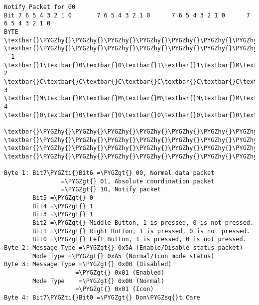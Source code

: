 \documentclass[a4paper,8pt,english]{sphinxmanual}
\def\PYGZgt{\char`\>}
\def\PYGZhy{\char`\-}
\def\PYGZsq{\char`\'}
\def\PYGZti{\char`\~}
\renewcommand\PYGZsq{\textquotesingle}
\begin{document}
\begin{Verbatim}[commandchars=\\\{\}]
Notify Packet for G0
Bit 7 6 5 4 3 2 1 0       7 6 5 4 3 2 1 0      7 6 5 4 3 2 1 0      7 6 5 4 3 2 1 0
BYTE  \textbar{}\PYGZhy{}\PYGZhy{}\PYGZhy{}\PYGZhy{}\PYGZhy{}\PYGZhy{}\PYGZhy{}\PYGZhy{}\PYGZhy{}\PYGZhy{}\PYGZhy{}\PYGZhy{}\PYGZhy{}\PYGZhy{}\PYGZhy{}\textbar{}BYTE \textbar{}\PYGZhy{}\PYGZhy{}\PYGZhy{}\PYGZhy{}\PYGZhy{}\PYGZhy{}\PYGZhy{}\PYGZhy{}\PYGZhy{}\PYGZhy{}\PYGZhy{}\PYGZhy{}\PYGZhy{}\PYGZhy{}\PYGZhy{}\textbar{}BYTE\textbar{}\PYGZhy{}\PYGZhy{}\PYGZhy{}\PYGZhy{}\PYGZhy{}\PYGZhy{}\PYGZhy{}\PYGZhy{}\PYGZhy{}\PYGZhy{}\PYGZhy{}\PYGZhy{}\PYGZhy{}\PYGZhy{}\PYGZhy{}\textbar{}BYTE\textbar{}\PYGZhy{}\PYGZhy{}\PYGZhy{}\PYGZhy{}\PYGZhy{}\PYGZhy{}\PYGZhy{}\PYGZhy{}\PYGZhy{}\PYGZhy{}\PYGZhy{}\PYGZhy{}\PYGZhy{}\PYGZhy{}\PYGZhy{}\textbar{}
  1   \textbar{}1\textbar{}0\textbar{}0\textbar{}1\textbar{}1\textbar{}M\textbar{}R\textbar{}L\textbar{}  2  \textbar{}C\textbar{}C\textbar{}C\textbar{}C\textbar{}C\textbar{}C\textbar{}C\textbar{}C\textbar{}  3 \textbar{}M\textbar{}M\textbar{}M\textbar{}M\textbar{}M\textbar{}M\textbar{}M\textbar{}M\textbar{}  4 \textbar{}0\textbar{}0\textbar{}0\textbar{}0\textbar{}0\textbar{}0\textbar{}0\textbar{}0\textbar{}
      \textbar{}\PYGZhy{}\PYGZhy{}\PYGZhy{}\PYGZhy{}\PYGZhy{}\PYGZhy{}\PYGZhy{}\PYGZhy{}\PYGZhy{}\PYGZhy{}\PYGZhy{}\PYGZhy{}\PYGZhy{}\PYGZhy{}\PYGZhy{}\textbar{}     \textbar{}\PYGZhy{}\PYGZhy{}\PYGZhy{}\PYGZhy{}\PYGZhy{}\PYGZhy{}\PYGZhy{}\PYGZhy{}\PYGZhy{}\PYGZhy{}\PYGZhy{}\PYGZhy{}\PYGZhy{}\PYGZhy{}\PYGZhy{}\textbar{}    \textbar{}\PYGZhy{}\PYGZhy{}\PYGZhy{}\PYGZhy{}\PYGZhy{}\PYGZhy{}\PYGZhy{}\PYGZhy{}\PYGZhy{}\PYGZhy{}\PYGZhy{}\PYGZhy{}\PYGZhy{}\PYGZhy{}\PYGZhy{}\textbar{}    \textbar{}\PYGZhy{}\PYGZhy{}\PYGZhy{}\PYGZhy{}\PYGZhy{}\PYGZhy{}\PYGZhy{}\PYGZhy{}\PYGZhy{}\PYGZhy{}\PYGZhy{}\PYGZhy{}\PYGZhy{}\PYGZhy{}\PYGZhy{}\textbar{}

Byte 1: Bit7\PYGZti{}Bit6 =\PYGZgt{} 00, Normal data packet
                =\PYGZgt{} 01, Absolute coordination packet
                =\PYGZgt{} 10, Notify packet
        Bit5 =\PYGZgt{} 0
        Bit4 =\PYGZgt{} 1
        Bit3 =\PYGZgt{} 1
        Bit2 =\PYGZgt{} Middle Button, 1 is pressed, 0 is not pressed.
        Bit1 =\PYGZgt{} Right Button, 1 is pressed, 0 is not pressed.
        Bit0 =\PYGZgt{} Left Button, 1 is pressed, 0 is not pressed.
Byte 2: Message Type =\PYGZgt{} 0x5A (Enable/Disable status packet)
        Mode Type =\PYGZgt{} 0xA5 (Normal/Icon mode status)
Byte 3: Message Type =\PYGZgt{} 0x00 (Disabled)
                    =\PYGZgt{} 0x01 (Enabled)
        Mode Type    =\PYGZgt{} 0x00 (Normal)
                    =\PYGZgt{} 0x01 (Icon)
Byte 4: Bit7\PYGZti{}Bit0 =\PYGZgt{} Don\PYGZsq{}t Care
\end{Verbatim}
\end{document}
